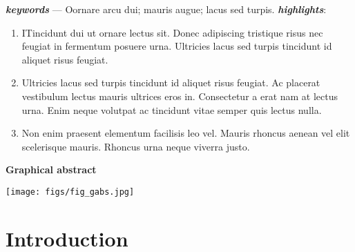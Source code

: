 \documentclass[12pt]{article}
\begin{document}
\begin{adjustwidth}{20pt}{20pt}
\begin{spacing}{0.8}
    \noindent \textit{\textbf{keywords}} --- Oornare arcu dui; mauris augue; lacus sed turpis.
    \newline
    \newline
    \newline
    \noindent \textit{\textbf{highlights}}:
        \begin{enumerate}
            \item ITincidunt dui ut ornare lectus sit. Donec adipiscing tristique risus nec feugiat in fermentum posuere urna. Ultricies lacus sed turpis tincidunt id aliquet risus feugiat. 
            \item Ultricies lacus sed turpis tincidunt id aliquet risus feugiat. Ac placerat vestibulum lectus mauris ultrices eros in. Consectetur a erat nam at lectus urna. Enim neque volutpat ac tincidunt vitae semper quis lectus nulla.
            \item Non enim praesent elementum facilisis leo vel. Mauris rhoncus aenean vel elit scelerisque mauris. Rhoncus urna neque viverra justo. 
        \end{enumerate}
\end{spacing}
\clearpage
\begin{center}
    \vspace{10mm}
    \textsf{\textbf{Graphical abstract}}
    \vspace{5mm}
\end{center}
    
\end{adjustwidth}
    
\begin{center}
    \texttt{[image: figs/fig\_gabs.jpg]}
\end{center}        
\clearpage

\normalsize
\tableofcontents
\clearpage    

\listoffigures
\clearpage	

\linenumbers %
\doublespacing %
	
\section{Introduction} \label{sec:intro}
\end{document}
